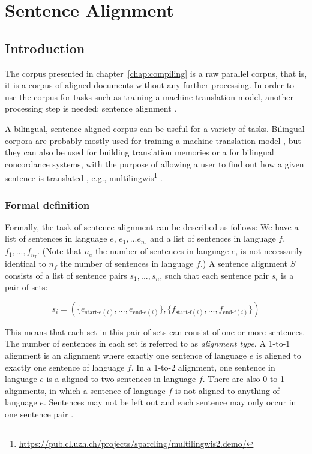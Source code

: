 \chapter{Sentence Alignment}\label{chap:sentence-alignment}
\section{Introduction}

The corpus presented in chapter~\ref{chap:compiling} is a raw parallel corpus, that is, it is a corpus of aligned documents without any further processing. 
In order to use the corpus for tasks such as training a machine translation model, another processing step is needed: sentence alignment \autocite[55]{koehn2009}.

A bilingual, sentence-aligned corpus can be useful for a variety of tasks. 
Bilingual corpora are  probably mostly used for training a machine translation model \autocites{gale-church-1991-program,moore2002fast,chen-1993-aligning}, but they can also be used for building translation memories \autocite{sennrich-volk-2011-iterative} or a for bilingual concordance systems, with the purpose of allowing a user to find out how a given sentence is translated \autocites{moore2002fast,gale-church-1991-program}, e.g., multilingwis\footnote{\url{https://pub.cl.uzh.ch/projects/sparcling/multilingwis2.demo/}} \autocite{multilingwis}.

\subsection{Formal definition}
Formally, the task of sentence alignment can be described as follows: We have a list of sentences in language \(e\), \(e_1,...e_{n_e}\) and a list of sentences in language \(f\), \(f_1,...,f_{n_f}\). 
(Note that \(n_e\) the number of sentences in language $e$, is not necessarily identical to \(n_f\) the number of sentences in language \(f\).) 
A sentence alignment \(S\) consists of a list of sentence pairs \(s_1, ..., s_n\), such that each sentence pair \(s_i\) is a pair of sets:

\[
	s_i = ( \{ e_{\text{start-e}(i)},... , e_{\text{end-e}(i)}\}, \{f_{\text{start-f}(i)},... , f_{\text{end-f}(i)}\} )
\]
\autocite[56]{koehn2009}

This means that each set in this pair of sets can consist of one or more sentences. 
The number of sentences in each set is referred to as \emph{alignment type}. 
A 1-to-1 alignment is an alignment where exactly one sentence of language \(e\)
is aligned to exactly one sentence of language \(f\). 
In a 1-to-2 alignment, one sentence in language \(e\) is a aligned to two sentences in language \(f\). 
There are also 0-to-1 alignments, in which a sentence of language \(f\) is not aligned to anything of language \(e\). 
Sentences may not be left out and each sentence may only occur in one sentence pair \autocite[57]{koehn2009}. 



